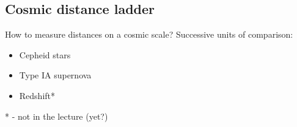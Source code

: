 \subsection{Cosmic distance ladder}
How to measure distances on a cosmic scale? Successive units of comparison:
\begin{itemize}
	\item Cepheid stars
	\item Type IA supernova
	\item Redshift*
\end{itemize}
* - not in the lecture (yet?)

